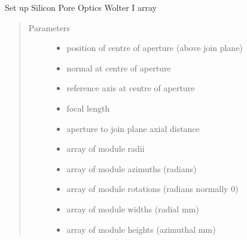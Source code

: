 \documentclass[letterpaper,10pt,english]{sphinxmanual}
\begin{document}
\begin{fulllineitems}
\label{\detokenize{xsrt_functions:xsrt.spoarr}}
Set up Silicon Pore Optics Wolter I array
\begin{quote}\begin{description}
\item[{Parameters}] \leavevmode\begin{itemize}
\item {} 
 \textendash{} position of centre of aperture (above join plane)

\item {} 
 \textendash{} normal at centre of aperture

\item {} 
 \textendash{} reference axis at centre of aperture

\item {} 
 \textendash{} focal length

\item {} 
 \textendash{} aperture to join plane axial distance

\item {} 
 \textendash{} array of module radii

\item {} 
 \textendash{} array of module azimuths (radians)

\item {} 
 \textendash{} array of module rotations (radians normally 0)

\item {} 
 \textendash{} array of module widths (radial mm)

\item {} 
 \textendash{} array of module heights (azimuthal mm)


\end{itemize}
\end{description}
\end{quote}
\end{fulllineitems}
\end{document}
